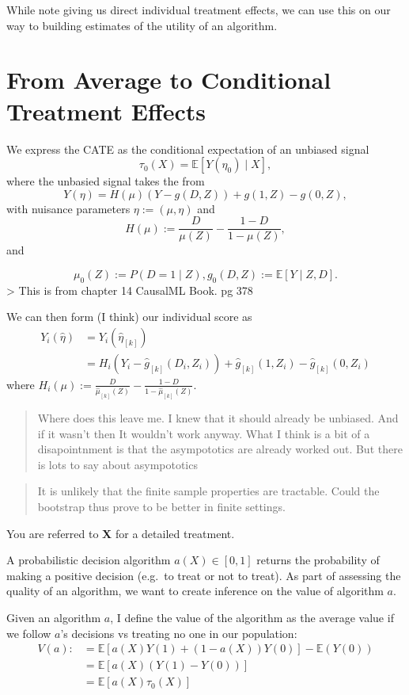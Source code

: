 \documentclass[
]{article}
\begin{document}
While note giving us direct individual treatment effects, we can use
this on our way to building estimates of the utility of an algorithm.

\section{From Average to Conditional Treatment
Effects}\label{from-average-to-conditional-treatment-effects}

We express the CATE as the conditional expectation of an unbiased signal
\[
\tau_{0}(X) = \mathbb{E}[Y(\eta_{0}) \mid X],
\] where the unbasied signal takes the from \[
Y(\eta) = H(\mu)(Y-g(D, Z)) + g(1, Z) - g(0, Z),
\] with nuisance parameters \(\eta  :=(\mu, \eta)\) and \[
H(\mu) := \frac{D}{\mu(Z)} - \frac{1-D}{1-\mu(Z)},
\] and

\[
\mu_{0}(Z) := P(D=1 \mid Z), g_{0}(D, Z) := \mathbb{E}[Y \mid Z, D].
\] \textgreater{} This is from chapter 14 CausalML Book. pg 378

We can then form (I think) our individual score as \[
\begin{aligned}
Y_{i}(\hat{\eta}) &= Y_{i}(\hat{\eta}_{[k]}) \\
&= H_{i}(Y_{i} - \hat{g}_{[k]}(D_{i}, Z_{i})) + \hat{g}_{[k]}(1, Z_{i}) - \hat{g}_{[k]}(0, Z_{i})
\end{aligned}
\] where
\(H_{i}(\mu) := \frac{D}{\hat{\mu}_{[k]}(Z)} - \frac{1-D}{1-\hat{\mu}_{[k]}(Z)}\).

\begin{quote}
Where does this leave me. I knew that it should already be unbiased. And
if it wasn't then It wouldn't work anyway. What I think is a bit of a
disapointnment is that the asympototics are already worked out. But
there is lots to say about asympototics
\end{quote}

\begin{quote}
It is unlikely that the finite sample properties are tractable. Could
the bootstrap thus prove to be better in finite settings.
\end{quote}

You are referred to \textbf{X} for a detailed treatment.

A probabilistic decision algorithm \(a(X) \in [0,1]\) returns the
probability of making a positive decision (e.g.~to treat or not to
treat). As part of assessing the quality of an algorithm, we want to
create inference on the value of algorithm \(a\).

Given an algorithm \(a\), I define the value of the algorithm as the
average value if we follow \(a\)'s decisions vs treating no one in our
population: \[
\begin{aligned}
V(a) :&= \mathbb{E}[a(X) Y(1) + (1-a(X))Y(0)] - \mathbb{E}(Y(0)) \\
&= \mathbb{E}[a(X)(Y(1) - Y(0))] \\
&= \mathbb{E}[a(X)\tau_{0}(X)]
\end{aligned}
\]
\end{document}
